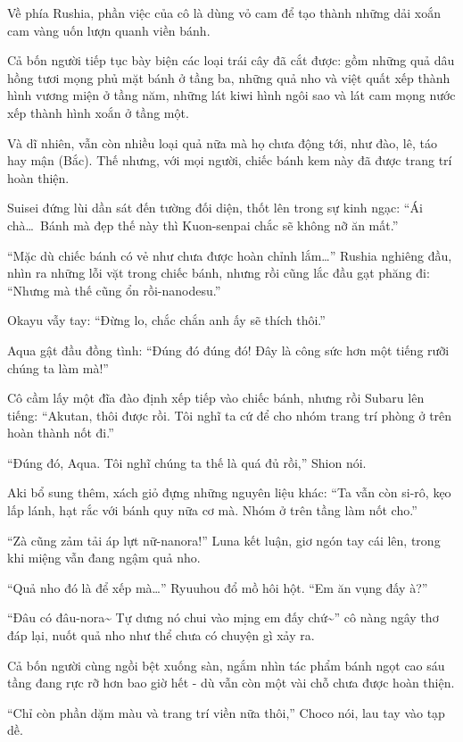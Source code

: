 \documentclass[../main.tex]{subfiles}
\begin{document}
Về phía Rushia, phần việc của cô là dùng vỏ cam để tạo thành những dải xoắn cam vàng uốn lượn quanh viền bánh.

Cả bốn người tiếp tục bày biện các loại trái cây đã cắt được: gồm những quả dâu hồng tươi mọng phủ mặt bánh ở tầng ba, những quả nho và việt quất xếp thành hình vương miện ở tầng năm, những lát kiwi hình ngôi sao và lát cam mọng nước xếp thành hình xoắn ở tầng một.

Và dĩ nhiên, vẫn còn nhiều loại quả nữa mà họ chưa động tới, như đào, lê, táo hay mận (Bắc). Thế nhưng, với mọi người, chiếc bánh kem này đã được trang trí hoàn thiện.

Suisei đứng lùi dần sát đến tường đối diện, thốt lên trong sự kinh ngạc: ``Ái chà\dots\ Bánh mà đẹp thế này thì Kuon-senpai chắc sẽ không nỡ ăn mất.''

``Mặc dù chiếc bánh có vẻ như chưa được hoàn chỉnh lắm\dots'' Rushia nghiêng đầu, nhìn ra những lỗi vặt trong chiếc bánh, nhưng rồi cũng lắc đầu gạt phăng đi: ``Nhưng mà thế cũng ổn rồi-nanodesu.''

Okayu vẫy tay: ``Đừng lo, chắc chắn anh ấy sẽ thích thôi.''

Aqua gật đầu đồng tình: ``Đúng đó đúng đó! Đây là công sức hơn một tiếng rưỡi chúng ta làm mà!''

Cô cầm lấy một đĩa đào định xếp tiếp vào chiếc bánh, nhưng rồi Subaru lên tiếng: ``Akutan, thôi được rồi. Tôi nghĩ ta cứ để cho nhóm trang trí phòng ở trên hoàn thành nốt đi.''

``Đúng đó, Aqua. Tôi nghĩ chúng ta thế là quá đủ rồi,'' Shion nói.

Aki bổ sung thêm, xách giỏ đựng những nguyên liệu khác: ``Ta vẫn còn si-rô, kẹo lấp lánh, hạt rắc với bánh quy nữa cơ mà. Nhóm ở trên tầng làm nốt cho.''

``Zà cũng zảm tải áp lựt nữ-nanora!'' Luna kết luận, giơ ngón tay cái lên, trong khi miệng vẫn đang ngậm quả nho.

``Quả nho đó là để xếp mà\dots'' Ryuuhou đổ mồ hôi hột. ``Em ăn vụng đấy à?''

``Đâu có đâu-nora\~{} Tự dưng nó chui vào mịng em đấy chứ\~{}'' cô nàng ngây thơ đáp lại, nuốt quả nho như thể chưa có chuyện gì xảy ra.

Cả bốn người cùng ngồi bệt xuống sàn, ngắm nhìn tác phẩm bánh ngọt cao sáu tầng đang rực rỡ hơn bao giờ hết - dù vẫn còn một vài chỗ chưa được hoàn thiện.

``Chỉ còn phần dặm màu và trang trí viền nữa thôi,'' Choco nói, lau tay vào tạp dề.
\end{document}

